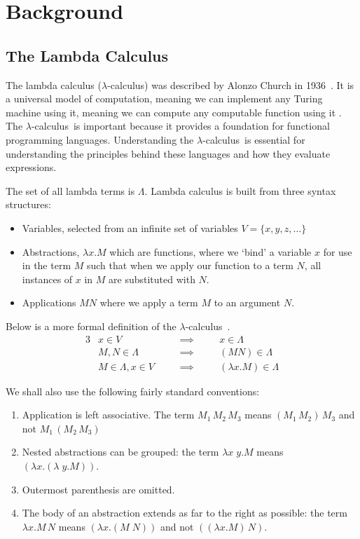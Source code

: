 \chapter{Background}
\label{chap:technical}

\section{The Lambda Calculus}
\newcommand{\lcalc}{$\lambda$-calculus}
\newcommand{\lCalc}{$\lambda$-Calculus}
\newcommand{\fto}{\rightarrow}
The lambda calculus (\lcalc) was described by Alonzo Church in 1936~\cite{church1936unsolvable}. It is a universal model of computation, meaning we can implement any Turing machine using it, meaning we can compute any computable function using it \cite{Turing_1937}. The \lcalc\ is important because it provides a foundation for functional programming languages. Understanding the \lcalc\ is essential for understanding the principles behind these languages and how they evaluate expressions.

The set of all lambda terms is $\Lambda$. Lambda calculus is built from three syntax structures:
\begin{itemize}
    \item Variables, selected from an infinite set of variables $V=\{x,y,z,\dots\}$
    \item Abstractions, $\lambda x. M$ which are functions, where we `bind' a variable $x$ for use in the term $M$ such that when we apply our function to a term $N$, all instances of $x$ in $M$ are substituted with $N$.
    \item Applications $M N$ where we apply a term $M$ to an argument $N$. 
\end{itemize}

\noindent Below is a more formal definition of the \lcalc~\cite{barendregt2013lambda}.
\begin{alignat*}{3}
&x \in V                 \quad && \implies \quad && x \in \Lambda               \\
&M,N \in \Lambda         \quad && \implies \quad && (M N) \in \Lambda           \\
&M \in \Lambda, x\in V   \quad && \implies \quad && (\lambda x. M) \in \Lambda  
\end{alignat*}

\noindent We shall also use the following fairly standard conventions:

\begin{enumerate}
    \item Application is left associative. The term $M_1\,M_2\,M_3$ means $(M_1\,M_2)\,M_3$ and not $M_1\,(M_2\,M_3)$
    \item Nested abstractions can be grouped: the term $\lambda x \;y. M$ means $(\lambda x . (\lambda\;y. M))$.
    \item Outermost parenthesis are omitted.
    \item The body of an abstraction extends as far to the right as possible: the term $\lambda x. M\,N$ means $(\lambda x. (M\;N))$ and not $((\lambda x. M)\,N)$. 
\end{enumerate}

